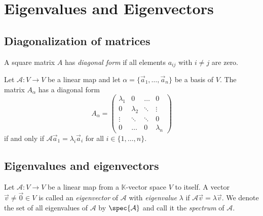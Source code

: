 \section{Eigenvalues and Eigenvectors}

\subsection{Diagonalization of matrices}
\begin{definition}
    A square matrix $A$ has \emph{diagonal form} if all elements $a_{ij}$ with $i \neq j$ are zero.
\end{definition}

\begin{theorem}
    Let $\mathcal{A}: V \to V$ be a linear map and let $\alpha = \{\vec{a}_1, \dots, \vec{a}_n\}$ be a basis of $V$.
    The matrix $A_\alpha$ has a diagonal form
    $$A_\alpha = \begin{pmatrix}
        \lambda_1 & 0 & \dots & 0 \\
        0 & \lambda_2 & \ddots & \vdots \\
        \vdots & \ddots & \ddots & 0\\
    0 & \dots & 0 & \lambda_n\end{pmatrix}$$
    if and only if $\mathcal{A}\vec{a}_1 = \lambda_i\vec{a}_i$ for all $i \in \{1, \dots, n\}$.
\end{theorem}

\subsection{Eigenvalues and eigenvectors}


\begin{definition}
    Let $\mathcal{A}: V \to V$ be a linear map from a $\mathbb{K}$-vector space $V$ to itself. A vector $\vec{v} \ne \vec{0} \in V$ is called an \emph{eigenvector} of $\mathcal{A}$
    with \emph{eigenvalue} $\lambda$ if $\mathcal{A}\vec{v} = \lambda\vec{v}$. We denote the set of all eigenvalues of
    $\mathcal{A}$ by $\spec{\mathcal{A}}$ and call it the \emph{spectrum} of $\mathcal{A}$.
\end{definition}

